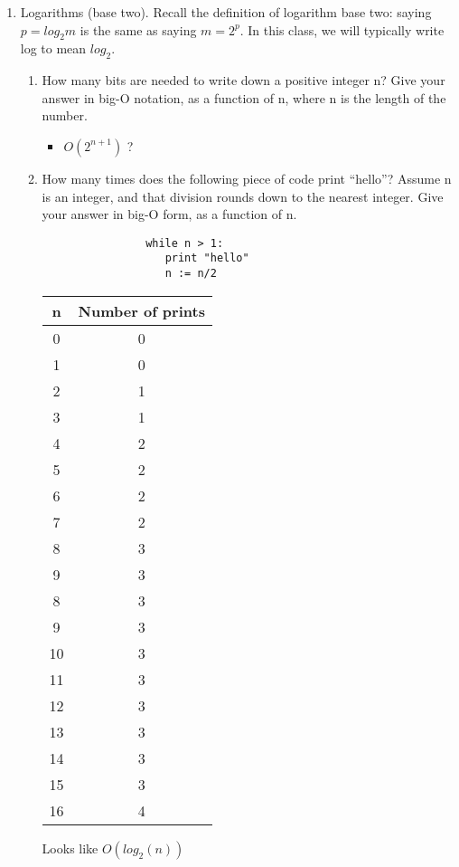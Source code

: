 \documentclass[12pt]{article}
\begin{document}
\begin{enumerate}
\newpage
\item Logarithms (base two). Recall the definition of logarithm base two: saying $p = log_2 m$ is the same as saying
$m = 2^p$. In this class, we will typically write log to mean $log_2$.
\begin{enumerate}

			\item How many bits are needed to write down a positive integer n? Give your answer in big-O notation,
			as a function of n, where n is the length of the number.
			\begin{itemize}
				\item $O(2^{n+1})$ ? 
			\end{itemize}
			
			
			\item How many times does the following piece of code print “hello”? Assume n is an integer, and that
			division rounds down to the nearest integer. Give your answer in big-O form, as a function of n.
			
			\begin{verbatim}
			    while n > 1:
			       print "hello"
			       n := n/2
			\end{verbatim}
			\begin{tabular}{|c|c|}\hline
				n &  Number of prints  \\ \hline
				0 & 0	\\ \hline
				1 & 0	\\ \hline
				2 & 1	\\ \hline
				3 & 1	\\ \hline
				4 & 2	\\ \hline
				5 & 2	\\ \hline
				6 & 2	\\ \hline
				7 & 2	\\ \hline
				8 & 3	\\ \hline
				9 & 3	\\ \hline
				8 & 3	\\ \hline
				9 & 3	\\ \hline
				10 & 3	\\ \hline
				11 & 3	\\ \hline
				12 & 3	\\ \hline
				13 & 3	\\ \hline
				14 & 3	\\ \hline
				15 & 3	\\ \hline
				16 & 4	\\ \hline
			\end{tabular}
		\vspace{5mm}
		Looks like $O(log_2(n))$

\end{enumerate}

\end{enumerate}
\end{document}
